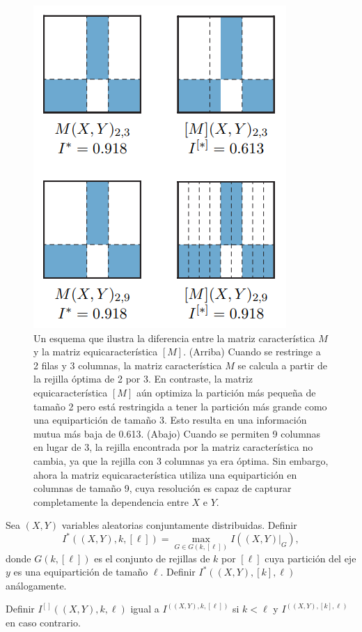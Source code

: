 	\begin{figure} 
		\centering
		\includegraphics[scale=0.6]{figuras/figure_1_reshef_2016.png}
		\caption{Un esquema que ilustra la diferencia entre la matriz caracter\'istica $M$ y la matriz equicaracter\'istica $[M]$. (Arriba) Cuando se restringe a 2 filas y 3 columnas, la matriz caracter\'istica $M$ se calcula a partir de la rejilla \'optima de 2 por 3. En contraste, la matriz equicaracter\'istica $[M]$ a\'un optimiza la partici\'on m\'as peque\~na de tama\~no 2 pero est\'a restringida a tener la partici\'on m\'as grande como una equipartici\'on de tama\~no 3. Esto resulta en una informaci\'on mutua m\'as baja de 0.613. (Abajo) Cuando se permiten 9 columnas en lugar de 3, la rejilla encontrada por la matriz caracter\'istica no cambia, ya que la rejilla con 3 columnas ya era \'optima. Sin embargo, ahora la matriz equicaracter\'istica utiliza una equipartici\'on en columnas de tama\~no 9, cuya resoluci\'on es capaz de capturar completamente la dependencia entre $X$ e $Y$.}
		\label{fig:matriz_equicaracteristica}
	\end{figure}
	

	\begin{defn}
		Sea $(X, Y)$ variables aleatorias conjuntamente distribuidas. Definir
		$$
		I^*((X, Y), k,[\ell])=\max _{G \in G(k,[\ell])} I\left(\left.(X, Y)\right|_G\right),
		$$
		donde $G(k,[\ell])$ es el conjunto de rejillas de $k$ por $[\ell]$ cuya partici\'on del eje $y$ es una equipartici\'on de tama\~no $\ell$. Definir $I^*((X, Y),[k], \ell)$ an\'alogamente.

		Definir $I^{[]}((X, Y), k, \ell)$ igual a $I^((X, Y), k,[\ell])$ si $k<\ell$ y $I^((X, Y),[k], \ell)$ en caso contrario.
	\end{defn}

